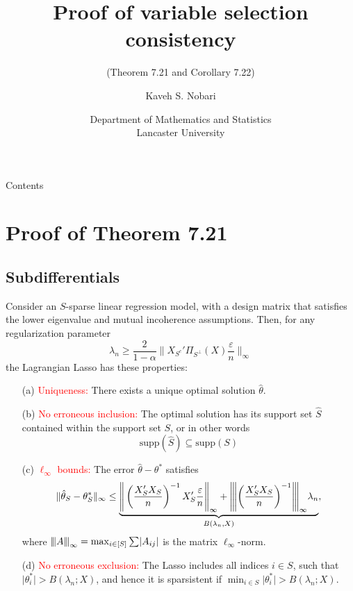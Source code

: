 \documentclass[10pt,handout,english]{beamer}
\title[]{Proof of variable selection consistency}
\subtitle[]{(Theorem 7.21 and Corollary 7.22)}
\author[Kaveh S. Nobari]{Kaveh S. Nobari}
\institute[]{Lectures in High-Dimensional Statistics}
\date[27/10/2020]
{Department of Mathematics and Statistics\\ Lancaster University}
\newcommand{\vertiii}[1]{{\left\vert\kern-0.25ex\left\vert\kern-0.25ex\left\vert #1 
    \right\vert\kern-0.25ex\right\vert\kern-0.25ex\right\vert}}
\begin{document}
\begin{frame}
\titlepage
\end{frame}


\begin{frame}{Contents}
\tableofcontents
\end{frame}

\section{Proof of Theorem 7.21}
\subsection{Subdifferentials}

\begin{frame}[allowframebreaks]
\begin{theorem}[Part I]
Consider an $S$-sparse linear regression model, with a design matrix that satisfies the lower eigenvalue and mutual incoherence assumptions. Then, for any regularization parameter\justifying
\begin{equation}\label{eq: lambdathm}
\lambda_n\geq\frac{2}{1-\alpha}\Bigg\lVert X_{S^c}'\Pi_{S^{\perp}}(X)\frac{\varepsilon}{n}\Bigg\rVert_{\infty}
\end{equation}
the Lagrangian Lasso has these properties:
\begin{itemize}
\item[(a)] \textcolor{red}{Uniqueness:} There exists a unique optimal solution $\hat{\theta}$.\justifying
\item[(b)] \textcolor{red}{No erroneous inclusion:} The optimal solution has its support set $\hat{S}$ contained within the support set $S$, or in other words\justifying
\[
\text{supp}(\hat{S})\subseteq \text{supp}(S) 
\]
\end{itemize}
\end{theorem}
\end{frame}


\begin{frame}

\begin{theorem}[Part II]
\begin{itemize}
\item[(c)] \textcolor{red}{$\ell_{\infty}$ bounds:} The error $\hat{\theta}-\theta^*$ satisfies
\begin{equation}\label{eq: linfty}
\lVert\hat{\theta}_S-\theta_S^*\rVert_{\infty}\leq\underbrace{\Bigg\lVert\left(\frac{X_S'X_S}{n}\right)^{-1}X_S'\frac{\varepsilon}{n}\Bigg\rVert_{\infty} +\vertiii{\left(\frac{X_S'X_S}{n}\right)^{-1}}_{\infty}\lambda_n}_{B(\lambda_n,X)},
\end{equation}
where $\vertiii{A}_{\infty}=\max_{i\in[S]}\sum\lvert A_{ij}\rvert$ is the matrix $\ell_{\infty}$-norm.
\item[(d)] \textcolor{red}{No erroneous exclusion:} The Lasso includes all indices $i\in S$, such that $\lvert\theta_i^*\rvert>B(\lambda_n;X)$, and hence it is sparsistent if $\min_{i\in S}\lvert\theta_i^*\rvert>B(\lambda_n;X)$.\justifying
\end{itemize}
\end{theorem}
\end{frame}
\end{document}
